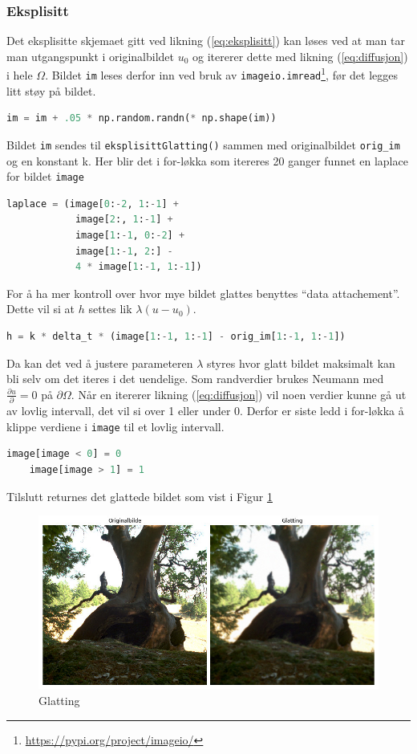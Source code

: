 \subsubsection{Eksplisitt}
Det eksplisitte skjemaet gitt ved likning (\ref{eq:eksplisitt}) kan løses ved at man tar man utgangspunkt i originalbildet $u_0$ og itererer dette med likning (\ref{eq:diffusjon}) i hele $\Omega$. Bildet \texttt{im} leses derfor inn ved bruk av \texttt{imageio.imread}\footnote{\url{https://pypi.org/project/imageio/}}, før det legges litt støy på bildet.
\begin{lstlisting}[language=Python]
    im = im + .05 * np.random.randn(* np.shape(im))
\end{lstlisting}
Bildet \texttt{im} sendes til \texttt{eksplisittGlatting()} sammen med originalbildet  \texttt{orig\_im} og en konstant k. Her blir det i for-løkka som itereres 20 ganger funnet en laplace for bildet \texttt{image}
\begin{lstlisting}[language=Python]
    laplace = (image[0:-2, 1:-1] + 
            image[2:, 1:-1] +
            image[1:-1, 0:-2] +
            image[1:-1, 2:] -
            4 * image[1:-1, 1:-1])
\end{lstlisting}
For å ha mer kontroll over hvor mye bildet glattes benyttes ``data attachement''. Dette vil si at $h$ settes lik $\lambda(u-u_0)$. 
\begin{lstlisting}[language=Python]
    h = k * delta_t * (image[1:-1, 1:-1] - orig_im[1:-1, 1:-1])
\end{lstlisting}
Da kan det ved å justere parameteren $\lambda$ styres hvor glatt bildet maksimalt kan bli selv om det iteres i det uendelige. Som randverdier brukes Neumann med $\frac{\partial u} {\partial} = 0$ på $\partial \Omega$. Når en itererer likning (\ref{eq:diffusjon}) vil noen verdier kunne gå ut av lovlig intervall, det vil si over 1 eller under 0. Derfor er siste ledd i for-løkka å klippe verdiene i \texttt{image} til et lovlig intervall.
\begin{lstlisting}[language=Python]
    image[image < 0] = 0
    image[image > 1] = 1
\end{lstlisting}
Tilslutt returnes det glattede bildet som vist i Figur \ref{fig:glattingEks}
\begin{figure}
\begin{center}
    \includegraphics[width=0.9\columnwidth]{bilder/glattingEksplisitt.jpg}
    \caption{Glatting~ \label{fig:glattingEks}}
\end{center}
\end{figure}

